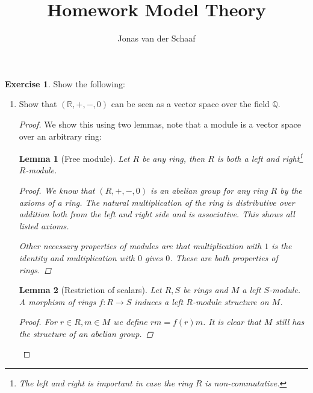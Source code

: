 \documentclass{article}
\title{Homework Model Theory}
\author{Jonas van der Schaaf}
\date{}
\newcommand{\Q}{\mathbb{Q}}
\newcommand{\R}{\mathbb{R}}
\newtheorem{lemma}{Lemma}
\theoremstyle{definition}
\newtheorem{question}{Exercise}
\begin{document}
\maketitle

\begin{question}
    Show the following:
    \begin{enumerate}[(1)]
        \item Show that \((\R,+,-,0)\) can be seen as a vector space over the
              field \(\Q\).

              \begin{proof}
                  We show this using two lemmas, note that a module is a vector
                  space over an arbitrary ring:

                  \begin{lemma}[Free module]
                      Let \(R\) be any ring, then \(R\) is both a left and
                      right\footnote{The left and right is important in case the
                          ring \(R\) is non-commutative.} \(R\)-module.

                      \begin{proof}
                          We know that \((R,+,-,0)\) is an abelian group for any
                          ring \(R\) by the axioms of a ring. The natural
                          multiplication of the ring is distributive over
                          addition both from the left and right side and is
                          associative. This shows all listed axioms.

                          Other necessary properties of modules are that
                          multiplication with \(1\) is the identity and
                          multiplication with \(0\) gives \(0\). These are both
                          properties of rings.
                      \end{proof}
                  \end{lemma}

                  \begin{lemma}[Restriction of scalars]
                      Let \(R,S\) be rings and \(M\) a left \(S\)-module. A
                      morphism of rings \(f:R\to S\) induces a left \(R\)-module
                      structure on \(M\).

                      \begin{proof}
                          For \(r\in R,m\in M\) we define \(rm=f(r)m\). It is
                          clear that \(M\) still has the structure of an abelian
                          group.


\end{proof}
\end{lemma}
\end{proof}
\end{enumerate}
\end{question}
\end{document}
